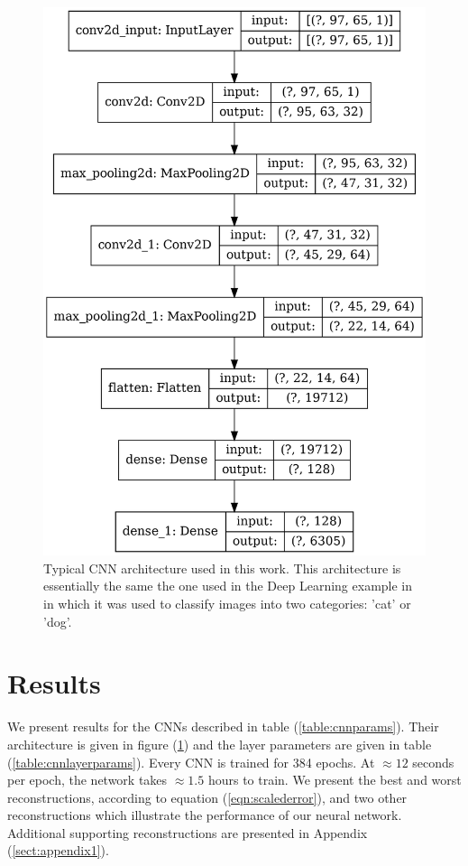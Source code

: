 \documentclass[12pt]{article}
\begin{document}
\begin{figure}[!h] 
   \centering
    \includegraphics[totalheight=9cm]{Figures/typical_cnn.png}
    \caption{\label{fig:typical_cnn}Typical CNN architecture used in this work. This architecture is essentially the same the one used in the Deep Learning example in \cite{misc:udemy} in which it was used to classify images into two categories: 'cat' or 'dog'.}
\end{figure}
%
%
\section{Results}
We present results for the CNNs described in table (\ref{table:cnnparams}). Their architecture is given in figure (\ref{fig:typical_cnn}) and the layer parameters are given in table (\ref{table:cnnlayerparams}). Every CNN is trained for 384 epochs. At $\approx{12}$ seconds per epoch, the network takes $\approx{1.5}$ hours to train. We present the best and worst reconstructions, according to equation (\ref{eqn:scalederror}), and two other reconstructions which illustrate the performance of our neural network. Additional supporting reconstructions are presented in Appendix (\ref{sect:appendix1}).
\end{document}
